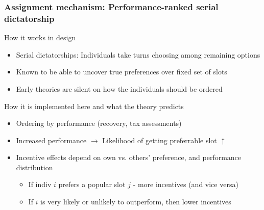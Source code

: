 \documentclass[aspectratio=169]{beamer}
\begin{document}
\begin{frame}
\frametitle{Assignment mechanism: Performance-ranked serial dictatorship}
How it works in design
\begin{itemize}\setlength\itemsep{3pt}
    \item Serial dictatorships: Individuals take turns choosing among remaining options
    \item Known to be able to uncover true preferences over fixed set of slots
    \item Early theories are silent on how the individuals should be ordered
  \end{itemize}\medskip
  How it is implemented here and what the theory predicts
\begin{itemize}\setlength\itemsep{3pt}
    \item Ordering by performance (recovery, tax assessments)
    \item Increased performance $\to$ Likelihood of getting preferrable slot $\uparrow$
    \item Incentive effects depend on own vs. others' preference, and performance distribution
    \begin{itemize}\setlength\itemsep{3pt}
    \item If indiv $i$ prefers a popular slot $j$ - more incentives (and vice versa)
    \item If $i$ is very likely or unlikely to outperform, then lower incentives
      \end{itemize}
  \end{itemize}
\end{frame}
\end{document}
